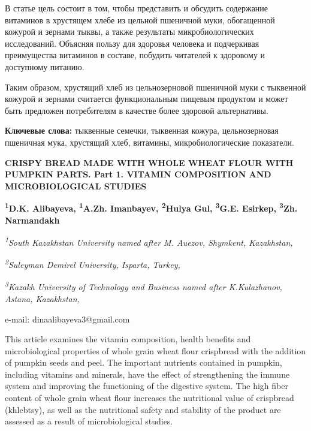 В статье цель состоит в том, чтобы представить и обсудить содержание
витаминов в хрустящем хлебе из цельной пшеничной муки, обогащенной
кожурой и зернами тыквы, а также результаты микробиологических
исследований. Объясняя пользу для здоровья человека и подчеркивая
преимущества витаминов в составе, побудить читателей к здоровому и
доступному питанию.

Таким образом, хрустящий хлеб из цельнозерновой пшеничной муки с
тыквенной кожурой и зернами считается функциональным пищевым продуктом и
может быть предложен потребителям в качестве более здоровой
альтернативы.

{\bfseries Ключевые слова:} тыквенные семечки, тыквенная кожура,
цельнозерновая пшеничная мука, хрустящий хлеб, витамины,
микробиологические показатели.

\begin{articleheader}
{\bfseries CRISPY BREAD MADE WITH WHOLE WHEAT FLOUR WITH PUMPKIN PARTS. Part 1. VITAMIN COMPOSITION AND MICROBIOLOGICAL STUDIES}

{\bfseries
\textsuperscript{1}D.K. Alibayeva\textsuperscript{\envelope },
\textsuperscript{1}A.Zh. Imanbayev,
\textsuperscript{2}Hulya Gul,
\textsuperscript{3}G.E. Esirkep,
\textsuperscript{3}Zh. Narmandakh}
\end{articleheader}

\begin{affiliation}
\emph{\textsuperscript{1}South Kazakhstan University named after M. Auezov, Shymkent, Kazakhstan,}

\emph{\textsuperscript{2}Suleyman Demirel University, Isparta, Turkey,}

\emph{\textsuperscript{3}Kazakh University of Technology and Business named after K.Kulazhanov, Astana, Kazakhstan,}

e-mail: dinaalibayeva3@gmail.com
\end{affiliation}

This article examines the vitamin composition, health benefits and
microbiological properties of whole grain wheat flour crispbread with
the addition of pumpkin seeds and peel. The important nutrients
contained in pumpkin, including vitamins and minerals, have the effect
of strengthening the immune system and improving the functioning of the
digestive system. The high fiber content of whole grain wheat flour
increases the nutritional value of crispbread (khlebtsy), as well as the
nutritional safety and stability of the product are assessed as a result
of microbiological studies.

